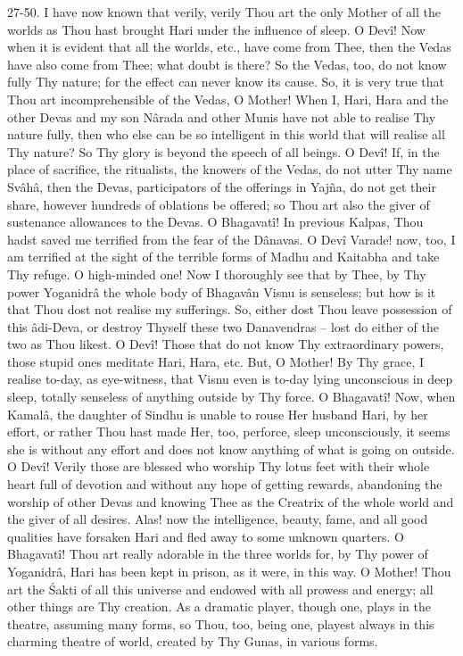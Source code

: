 27-50. I have now known that verily, verily Thou art the only Mother of all the worlds as Thou hast brought Hari under the influence of sleep. O Dev\^i! Now when it is evident that all the worlds, etc., have come from Thee, then the Vedas have also come from Thee; what doubt is there? So the Vedas, too, do not know fully Thy nature; for the effect can never know its cause. So, it is very true that Thou art incomprehensible of the Vedas, O Mother! When I, Hari, Hara and the other Devas and my son N\^arada and other Munis have not able to realise Thy nature fully, then who else can be so intelligent in this world that will realise all Thy nature? So Thy glory is beyond the speech of all beings. O Dev\^i! If, in the place of sacrifice, the ritualists, the knowers of the Vedas, do not utter Thy name Sv\^ah\^a, then the Devas, participators of the offerings in Yajña, do not get their share, however hundreds of oblations be offered; so Thou art also the giver of sustenance allowances to the Devas. O Bhagavat\^i! In previous Kalpas, Thou hadst saved me terrified from the fear of the D\^anavas. O Dev\^i Varade! now, too, I am terrified at the sight of the terrible forms of Madhu and Kaitabha and take Thy refuge. O high-minded one! Now I thoroughly see that by Thee, by Thy power Yoganidr\^a the whole body of Bhagav\^an Visnu is senseless; but how is it that Thou dost not realise my sufferings. So, either dost Thou leave possession of this \^adi-Deva, or destroy Thyself these two Danavendras -- lost do either of the two as Thou likest. O Dev\^i! Those that do not know Thy extraordinary powers, those stupid ones meditate Hari, Hara, etc. But, O Mother! By Thy grace, I realise to-day, as eye-witness, that Visnu even is to-day lying unconscious in deep sleep, totally senseless of anything outside by Thy force. O Bhagavat\^i! Now, when Kamal\^a, the daughter of Sindhu is unable to rouse Her husband Hari, by her effort, or rather Thou hast made Her, too, perforce, sleep unconsciously, it seems she is without any effort and does not know anything of what is going on outside. O Dev\^i! Verily those are blessed who worship Thy lotus feet with their whole heart full of devotion and without any hope of getting rewards, abandoning the worship of other Devas and knowing Thee as the Creatrix of the whole world and the giver of all desires. Alas! now the intelligence, beauty, fame, and all good qualities have forsaken Hari and fled away to some unknown quarters. O Bhagavat\^i! Thou art really adorable in the three worlds for, by Thy power of Yoganidr\^a, Hari has been kept in prison, as it were, in this way. O Mother! Thou art the \'Sakti of all this universe and endowed with all prowess and energy; all other things are Thy creation. As a dramatic player, though one, plays in the theatre, assuming many forms, so Thou, too, being one, playest always in this charming theatre of world, created by Thy Gunas, in various forms.

